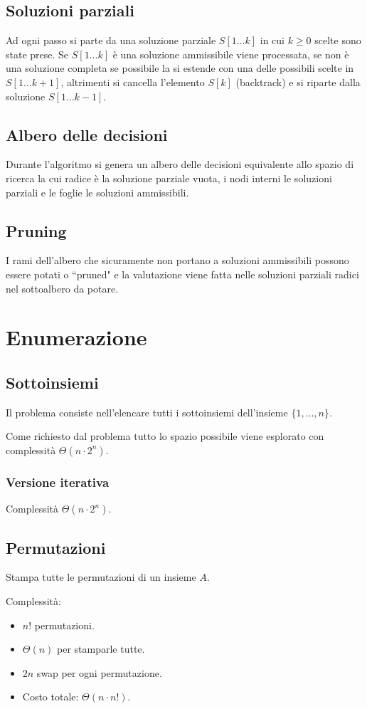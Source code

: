 \subsection{Soluzioni parziali}
Ad ogni passo si parte da una soluzione parziale $S[1\dots k]$ in cui $k\ge 0$ scelte sono state prese. Se $S[1\dots k]$ \`e una soluzione ammissibile viene processata, se non \`e 
una soluzione completa se possibile la si estende con una delle possibili scelte in $S[1\dots k+1]$, altrimenti si cancella l'elemento $S[k]$ (backtrack) e si riparte dalla soluzione
$S[1\dots k-1]$.
\subsection{Albero delle decisioni}
Durante l'algoritmo si genera un albero delle decisioni equivalente allo spazio di ricerca la cui radice \`e la soluzione parziale vuota, i nodi interni le soluzioni parziali e le
foglie le soluzioni ammissibili.
\subsection{Pruning}
I rami dell'albero che sicuramente non portano a soluzioni ammissibili possono essere potati o ``pruned" e la valutazione viene fatta nelle soluzioni parziali radici nel sottoalbero da
potare.
\section{Enumerazione}

\subsection{Sottoinsiemi}
Il problema consiste nell'elencare tutti i sottoinsiemi dell'insieme $\{1, \dots, n\}$.
\begin{multicols}{2}

\columnbreak

\end{multicols}
Come richiesto dal problema tutto lo spazio possibile viene esplorato con complessit\`a $\Theta(n\cdot 2^n)$.
\subsubsection{Versione iterativa}

Complessit\`a $\Theta(n\cdot 2^n)$.
\subsection{Permutazioni}
Stampa tutte le permutazioni di un insieme $A$.
\begin{multicols}{2}

\columnbreak

Complessit\`a:
\begin{itemize}
	\item $n!$ permutazioni.
	\item $\Theta(n)$ per stamparle tutte.
	\item $2n$ swap per ogni permutazione.
	\item Costo totale: $\Theta(n\cdot n!)$.
\end{itemize}
\end{multicols}
